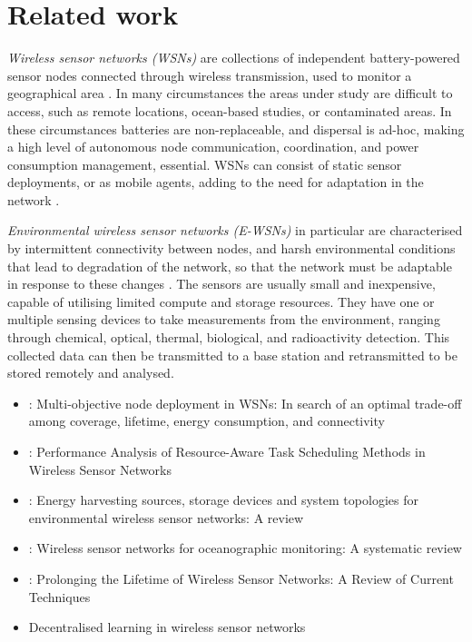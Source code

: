\section{Related work}
\label{section:background}
\textit{Wireless sensor networks (WSNs)} are collections of independent battery-powered sensor nodes connected through wireless transmission, used to monitor a geographical area \citep{Akyildiz,Yick2008a}. In many circumstances the areas under study are difficult to access, such as remote locations, ocean-based studies, or contaminated areas. In these circumstances batteries are non-replaceable, and dispersal is ad-hoc, making a high level of autonomous node communication, coordination, and power consumption management, essential. WSNs can consist of static sensor deployments, or as mobile agents, adding to the need for adaptation in the network \citep{ramasamy2017mobile, 4224091} .

\textit{Environmental wireless sensor networks (E-WSNs)} in particular are characterised by intermittent connectivity between nodes, and harsh environmental conditions that lead to degradation of the network, so that the network must be adaptable in response to these changes \citep{Oliveira2011}. The sensors are usually small and inexpensive, capable of utilising limited compute and storage resources. They have one or multiple sensing devices to take measurements from the environment, ranging through chemical, optical, thermal, biological, and radioactivity detection. This collected data can then be transmitted to a base station and retransmitted to be stored remotely and analysed.

\begin{itemize}
	\item \cite{Sengupta2013}: Multi-objective node deployment in WSNs: In search of an optimal trade-off among coverage, lifetime, energy consumption, and connectivity 
	
	
	\item  \cite{doi:10.1155/2014/765182}: Performance Analysis of Resource-Aware Task Scheduling Methods in Wireless Sensor Networks

	
	\item \cite{Prauzek2018}: Energy harvesting sources, storage devices and system topologies for environmental wireless sensor networks: A review
	
	
	\item \cite{Albaladejo2010}: Wireless sensor networks for oceanographic monitoring: A systematic review
	
	\item \cite{10.1155/2018/8035065}: Prolonging the Lifetime of Wireless Sensor Networks: A Review of Current Techniques
	
	\item \cite{10.1504/IJCNDS.2012.048871} Decentralised learning in wireless sensor networks
\end{itemize}